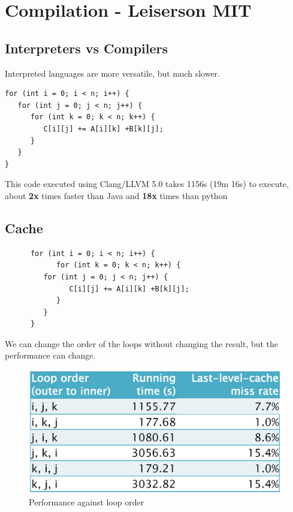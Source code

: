 \chapter{Compilation - Leiserson MIT}
\section{Interpreters vs Compilers}
Interpreted languages are more versatile, but much slower.
\begin{lstlisting}
for (int i = 0; i < n; i++) {
   for (int j = 0; j < n; j++) {
      for (int k = 0; k < n; k++) {
         C[i][j] += A[i][k] +B[k][j];
      }
   }
}
\end{lstlisting}
This code executed using Clang/LLVM 5.0 takes 1156s (19m 16s) to execute, about \textbf{2x} times faster than Java and \textbf{18x} times than python


\section{Cache}
\begin{paracol}{2}
   \colfill
   \begin{lstlisting}
      for (int i = 0; i < n; i++) {
            for (int k = 0; k < n; k++) {
         for (int j = 0; j < n; j++) {
               C[i][j] += A[i][k] +B[k][j];
            }
         }
      }
   \end{lstlisting}
   \colfill

   We can change the order of the loops without changing the result, but the performance can change.

   \switchcolumn

   \begin{figure}[htbp]
      \centering
      \includegraphics[width=0.9\columnwidth]{images/02/caches_looporder.png}
      \caption{Performance against loop order}
      \label{fig:caches_looporder}
   \end{figure}
   
\end{paracol}

